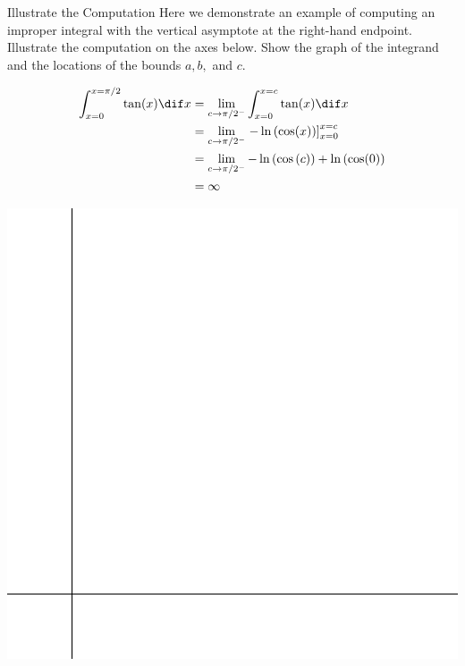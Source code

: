 \begin{exercise}{Illustrate the Computation  \Coffeecup} Here we demonstrate an example of computing an improper integral with the vertical asymptote at the right-hand endpoint.  Illustrate the computation on the axes below.  Show the graph of the integrand and the locations of the bounds $a,b,$ and $c$.  

\begin{align*}
\int_{x=0}^{x=\pi/2}\tan(x)\dif x &= \lim_{c\rightarrow \pi/2^-}\int_{x=0}^{x=c}\tan(x)\dif x \\
&=\lim_{c\rightarrow \pi/2^-}\left. -\ln\left(\cos(x)\right)\right]_{x=0}^{x=c} \\
&=\lim_{c\rightarrow \pi/2^-} -\ln\left(\cos\left(c\right)\right)+\ln\left(\cos(0)\right) \\
&=\infty
\end{align*}
\begin{center}
\includegraphics[scale=0.8]{quad1.eps}
\end{center}
\solushun{\begin{center}

\end{center}}
\end{exercise}
